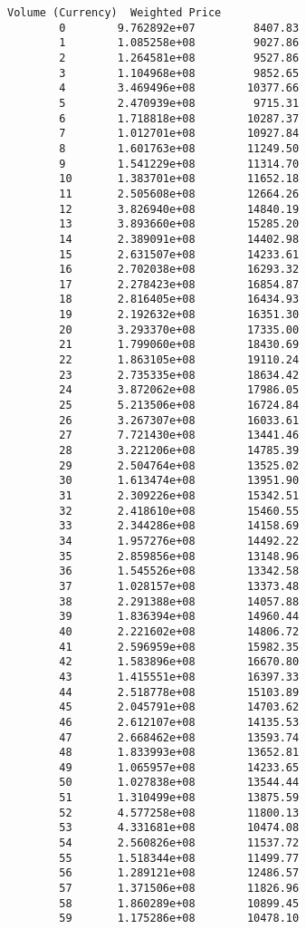 \documentclass[11pt]{article}
\begin{document}
\begin{Verbatim}[commandchars=\\\{\}]
            Volume (Currency)  Weighted Price  
        0        9.762892e+07         8407.83  
        1        1.085258e+08         9027.86  
        2        1.264581e+08         9527.86  
        3        1.104968e+08         9852.65  
        4        3.469496e+08        10377.66  
        5        2.470939e+08         9715.31  
        6        1.718818e+08        10287.37  
        7        1.012701e+08        10927.84  
        8        1.601763e+08        11249.50  
        9        1.541229e+08        11314.70  
        10       1.383701e+08        11652.18  
        11       2.505608e+08        12664.26  
        12       3.826940e+08        14840.19  
        13       3.893660e+08        15285.20  
        14       2.389091e+08        14402.98  
        15       2.631507e+08        14233.61  
        16       2.702038e+08        16293.32  
        17       2.278423e+08        16854.87  
        18       2.816405e+08        16434.93  
        19       2.192632e+08        16351.30  
        20       3.293370e+08        17335.00  
        21       1.799060e+08        18430.69  
        22       1.863105e+08        19110.24  
        23       2.735335e+08        18634.42  
        24       3.872062e+08        17986.05  
        25       5.213506e+08        16724.84  
        26       3.267307e+08        16033.61  
        27       7.721430e+08        13441.46  
        28       3.221206e+08        14785.39  
        29       2.504764e+08        13525.02  
        30       1.613474e+08        13951.90  
        31       2.309226e+08        15342.51  
        32       2.418610e+08        15460.55  
        33       2.344286e+08        14158.69  
        34       1.957276e+08        14492.22  
        35       2.859856e+08        13148.96  
        36       1.545526e+08        13342.58  
        37       1.028157e+08        13373.48  
        38       2.291388e+08        14057.88  
        39       1.836394e+08        14960.44  
        40       2.221602e+08        14806.72  
        41       2.596959e+08        15982.35  
        42       1.583896e+08        16670.80  
        43       1.415551e+08        16397.33  
        44       2.518778e+08        15103.89  
        45       2.045791e+08        14703.62  
        46       2.612107e+08        14135.53  
        47       2.668462e+08        13593.74  
        48       1.833993e+08        13652.81  
        49       1.065957e+08        14233.65  
        50       1.027838e+08        13544.44  
        51       1.310499e+08        13875.59  
        52       4.577258e+08        11800.13  
        53       4.331681e+08        10474.08  
        54       2.560826e+08        11537.72  
        55       1.518344e+08        11499.77  
        56       1.289121e+08        12486.57  
        57       1.371506e+08        11826.96  
        58       1.860289e+08        10899.45  
        59       1.175286e+08        10478.10  
\end{Verbatim}
            
\end{document}

